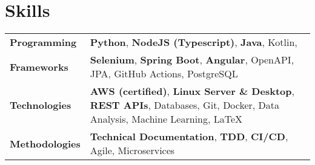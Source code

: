 \documentclass{style/modernsimplecv}
\newlength{\rightcolwidth}
\newlength{\leftcolwidth}
\begin{document}
\begin{paracol}{2}
\begin{minipage}[t]{\leftcolwidth}
\begin{tabular}{p{}| p{}}
        \end{tabular}
        \bigskip
        \begin{minipage}[t]{\leftcolwidth}
            \section*{Skills}
            {\normalsize

            \begin{tabular}{>{\bfseries}p{} >{}p{}}
                \textbf{Programming}  & 
                    \textbf{Python}, 
                    \textbf{NodeJS (Typescript)},
                    \textbf{Java},
                    Kotlin,\\
                \textbf{Frameworks} & 
                    \textbf{Selenium},
                    \textbf{Spring Boot}, 
                    \textbf{Angular},
                    OpenAPI,
                    JPA,
                    GitHub Actions, 
                    PostgreSQL\\
                \textbf{Technologies} & 
                    \textbf{AWS (certified)},
                    \textbf{Linux Server \& Desktop},
                    \textbf{REST APIs},  
                    Databases, 
                    Git, 
                    Docker, 
                    Data Analysis, 
                    Machine Learning, 
                    LaTeX\\
                \textbf{Methodologies} & 
                    \textbf{Technical Documentation},
                    \textbf{TDD},
                    \textbf{CI/CD},
                    Agile, 
                    Microservices\\
            \end{tabular} 
            }

        \end{minipage}\hfill
    \end{minipage}
    \switchcolumn
    \bigskip
    \begin{minipage}[t]{\rightcolwidth}

\end{minipage}
\end{paracol}
\end{document}
